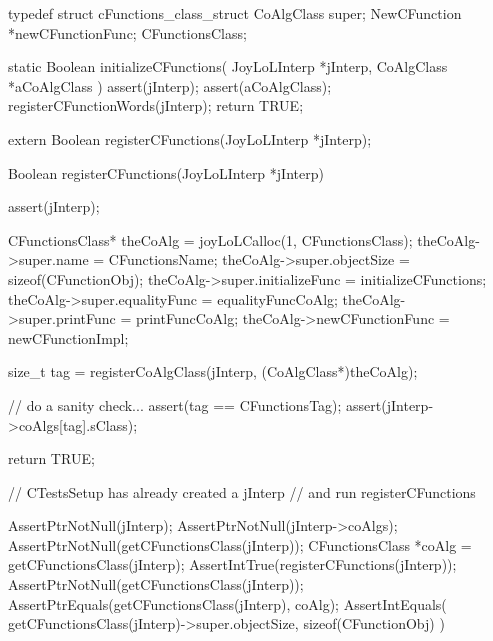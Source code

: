 \startTestSuite[registerCFunctions]

\startCHeader
typedef struct cFunctions_class_struct {
  CoAlgClass    super;
  NewCFunction *newCFunctionFunc;
} CFunctionsClass;
\stopCHeader

\startCCode
static Boolean initializeCFunctions(
  JoyLoLInterp *jInterp,
  CoAlgClass   *aCoAlgClass
) {
  assert(jInterp);
  assert(aCoAlgClass);
  registerCFunctionWords(jInterp);
  return TRUE;
}
\stopCCode

\startCHeader
extern Boolean registerCFunctions(JoyLoLInterp *jInterp);
\stopCHeader
{}

\startCCode
Boolean registerCFunctions(JoyLoLInterp *jInterp) {
  assert(jInterp);
  
  CFunctionsClass* theCoAlg    =
    joyLoLCalloc(1, CFunctionsClass);
  theCoAlg->super.name           = CFunctionsName;
  theCoAlg->super.objectSize     = sizeof(CFunctionObj);
  theCoAlg->super.initializeFunc = initializeCFunctions;
  theCoAlg->super.equalityFunc   = equalityFuncCoAlg;
  theCoAlg->super.printFunc      = printFuncCoAlg;
  theCoAlg->newCFunctionFunc     = newCFunctionImpl;
  
  size_t tag =
    registerCoAlgClass(jInterp, (CoAlgClass*)theCoAlg);

  // do a sanity check...
  assert(tag == CFunctionsTag);
  assert(jInterp->coAlgs[tag].sClass);

  return TRUE;
}
\stopCCode


\startCTest
  // CTestsSetup has already created a jInterp
  // and run registerCFunctions
  
  AssertPtrNotNull(jInterp);
  AssertPtrNotNull(jInterp->coAlgs);
  AssertPtrNotNull(getCFunctionsClass(jInterp));
  CFunctionsClass *coAlg =
    getCFunctionsClass(jInterp);
  AssertIntTrue(registerCFunctions(jInterp));
  AssertPtrNotNull(getCFunctionsClass(jInterp));
  AssertPtrEquals(getCFunctionsClass(jInterp), coAlg);
  AssertIntEquals(
    getCFunctionsClass(jInterp)->super.objectSize,
    sizeof(CFunctionObj)
  )
\stopCTest
\stopTestCase
\stopTestSuite